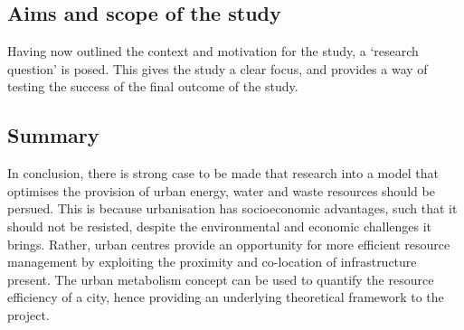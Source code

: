 
\subsection{Aims and scope of the study} \label{sec:aims}
Having now outlined the context and motivation for the study, a `research question' is posed. This gives the study a clear focus, and provides a way of testing the success of the final outcome of the study.


%

\subsection*{Summary}
In conclusion, there is strong case to be made that research into a model that optimises the provision of urban energy, water and waste resources should be persued. This is because urbanisation has socioeconomic advantages, such that it should not be resisted, despite the environmental and economic challenges it brings. Rather, urban centres provide an opportunity for more efficient resource management by exploiting the proximity and co-location of infrastructure present. The urban metabolism concept can be used to quantify the resource efficiency of a city, hence providing an underlying theoretical framework to the project.%
